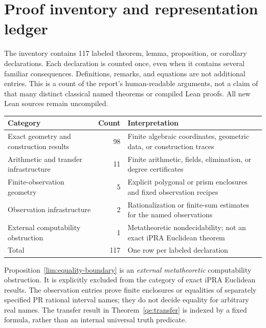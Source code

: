 \section{Proof inventory and representation ledger}
\label{sec:inventory}
The inventory contains 117 labeled theorem, lemma, proposition, or corollary
declarations. Each declaration is counted once, even when it contains
several familiar consequences. Definitions, remarks, and equations are
not additional entries. This is a count of the report's human-readable
arguments, not a claim of that many distinct classical named theorems
or compiled Lean proofs. All new Lean sources remain uncompiled.

\begin{center}\small
\begin{tabular}{@{}>{\raggedright\arraybackslash}p{}r>{\raggedright\arraybackslash}p{}@{}}
\toprule Category & Count & Interpretation\\\midrule
Exact geometry and construction results & 98 & Finite algebraic coordinates, geometric data, or construction traces\\
Arithmetic and transfer infrastructure & 11 & Finite arithmetic, fields, elimination, or degree certificates\\
Finite-observation geometry & 5 & Explicit polygonal or prism enclosures and fixed observation recipes\\
Observation infrastructure & 2 & Rationalization or finite-sum estimates for the named observations\\
External computability obstruction & 1 & Metatheoretic nondecidability; not an exact iPRA Euclidean theorem\\
\midrule Total & 117 & One row per labeled declaration\\
\bottomrule\end{tabular}\end{center}

Proposition~\ref{lim:equality-boundary} is an \emph{external metatheoretic}
computability obstruction. It is explicitly excluded from the category
of exact iPRA Euclidean results. The observation entries prove finite
enclosures or equalities of separately specified PR rational interval
names; they do not decide equality for arbitrary real names.
The transfer result in Theorem~\ref{qe:transfer} is indexed by a fixed
formula, rather than an internal universal truth predicate.

